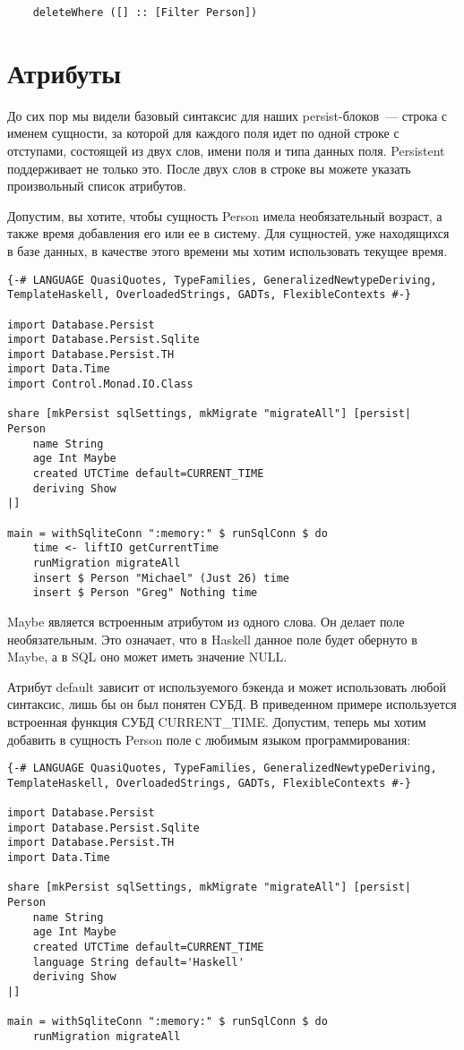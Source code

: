 \begin{lstlisting}
    deleteWhere ([] :: [Filter Person])
\end{lstlisting}

\section{Атрибуты} %

До сих пор мы видели базовый синтаксис для наших persist-блоков~--- строка с именем сущности, за которой для каждого поля идет по одной строке с отступами, состоящей из двух слов, имени поля и типа данных поля. Persistent поддерживает не только это. После двух слов в строке вы можете указать произвольный список атрибутов.

Допустим, вы хотите, чтобы сущность Person имела необязательный возраст, а также время добавления его или ее в систему. Для сущностей, уже находящихся в базе данных, в качестве этого времени мы хотим использовать текущее время.

\begin{lstlisting}
{-# LANGUAGE QuasiQuotes, TypeFamilies, GeneralizedNewtypeDeriving, TemplateHaskell, OverloadedStrings, GADTs, FlexibleContexts #-}

import Database.Persist
import Database.Persist.Sqlite
import Database.Persist.TH
import Data.Time
import Control.Monad.IO.Class

share [mkPersist sqlSettings, mkMigrate "migrateAll"] [persist|
Person
    name String
    age Int Maybe
    created UTCTime default=CURRENT_TIME
    deriving Show
|]

main = withSqliteConn ":memory:" $ runSqlConn $ do
    time <- liftIO getCurrentTime
    runMigration migrateAll
    insert $ Person "Michael" (Just 26) time
    insert $ Person "Greg" Nothing time
\end{lstlisting}%

Maybe является встроенным атрибутом из одного слова. Он делает поле необязательным. Это означает, что в Haskell данное поле будет обернуто в Maybe, а в SQL оно может иметь значение NULL.

Атрибут default зависит от используемого бэкенда и может использовать любой синтаксис, лишь бы он был понятен СУБД. В приведенном примере используется встроенная функция СУБД CURRENT\_TIME. Допустим, теперь мы хотим добавить в сущность Person поле с любимым языком программирования:

\begin{lstlisting}
{-# LANGUAGE QuasiQuotes, TypeFamilies, GeneralizedNewtypeDeriving, TemplateHaskell, OverloadedStrings, GADTs, FlexibleContexts #-}

import Database.Persist
import Database.Persist.Sqlite
import Database.Persist.TH
import Data.Time

share [mkPersist sqlSettings, mkMigrate "migrateAll"] [persist|
Person
    name String
    age Int Maybe
    created UTCTime default=CURRENT_TIME
    language String default='Haskell'
    deriving Show
|]

main = withSqliteConn ":memory:" $ runSqlConn $ do
    runMigration migrateAll
\end{lstlisting}%

